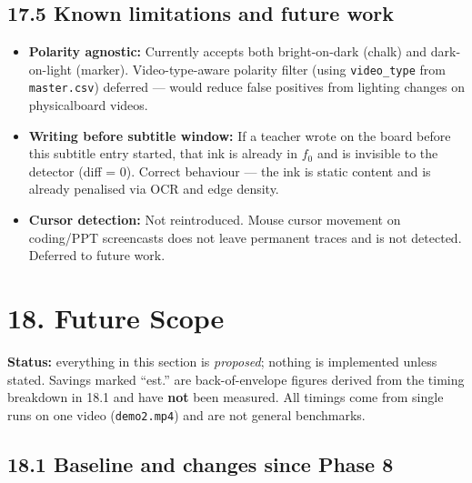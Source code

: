 \documentclass[11pt]{article}
\begin{document}
\subsection*{17.5 Known limitations and future work}
\begin{itemize}[leftmargin=1.2em]
    \item \textbf{Polarity agnostic:} Currently accepts both bright-on-dark (chalk) and dark-on-light (marker). Video-type-aware polarity filter (using \texttt{video\_type} from \texttt{master.csv}) deferred --- would reduce false positives from lighting changes on physicalboard videos.
    \item \textbf{Writing before subtitle window:} If a teacher wrote on the board before this subtitle entry started, that ink is already in $f_0$ and is invisible to the detector (diff = 0). Correct behaviour --- the ink is static content and is already penalised via OCR and edge density.
    \item \textbf{Cursor detection:} Not reintroduced. Mouse cursor movement on coding/PPT screencasts does not leave permanent traces and is not detected. Deferred to future work.
\end{itemize}

\bigskip

\section*{18. Future Scope}

\textbf{Status:} everything in this section is \emph{proposed}; nothing is implemented unless stated. Savings marked ``est.'' are back-of-envelope figures derived from the timing breakdown in 18.1 and have \textbf{not} been measured. All timings come from single runs on one video (\texttt{demo2.mp4}) and are not general benchmarks.

\subsection*{18.1 Baseline and changes since Phase 8}
\end{document}

